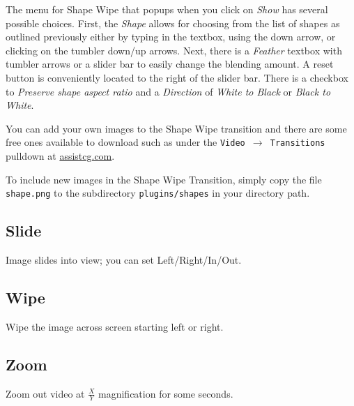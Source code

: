The menu for Shape Wipe that popups when you click on \textit{Show} has several possible choices.  First, the \textit{Shape} allows for choosing from the list of shapes as outlined previously either by typing in the textbox, using the down arrow, or clicking on the tumbler down/up arrows.
Next, there is a \textit{Feather} textbox with tumbler arrows or a slider bar to easily change the blending amount.  A reset button is conveniently located to the right of the slider bar.  There is a checkbox to \textit{Preserve shape aspect ratio} and a \textit{Direction} of \textit{White to Black} or \textit{Black to White}.

You can add your own images to the Shape Wipe transition and there are some free ones available to download such as under the \texttt{Video $\rightarrow$ Transitions} pulldown at {\small \url{assistcg.com}}.

To include new images in the Shape Wipe Transition, simply copy the file \texttt{{shape}.png} to the
 subdirectory \texttt{plugins/shapes} in your \CGG{} directory path.

\subsection*{Slide}%
\label{sub:slide}

Image slides into view; you can set Left/Right/In/Out.

\subsection*{Wipe}%
\label{sub:wipe}

Wipe the image across screen starting left or right.

\subsection*{Zoom}%
\label{sub:zoom}

Zoom out video at $\frac{X}{Y}$ magnification for some seconds.

